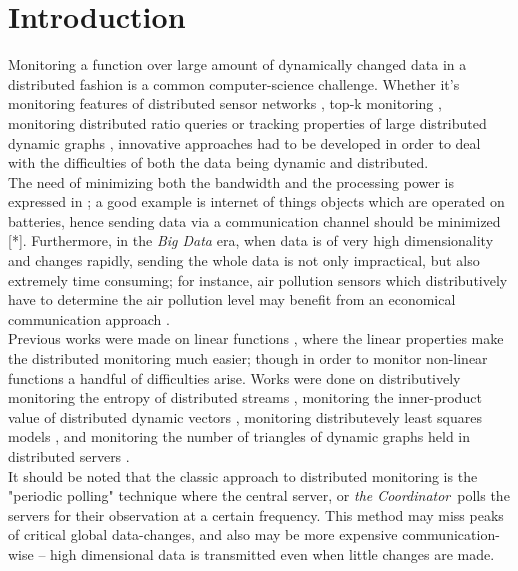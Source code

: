 \documentclass[10pt, conference]{IEEEtran}
\newcommand{\theCoordinator}{\textit{the Coordinator}}
\begin{document}
\section{Introduction}
Monitoring a function over large amount of dynamically changed data in a distributed fashion is a common computer-science challenge. Whether it's monitoring features of distributed sensor networks \cite{burdakis2012detecting}, top-k monitoring \cite{babcock2003distributed}, monitoring distributed ratio queries \cite{gupta2013ratio} or tracking properties of large distributed dynamic graphs \cite{mcgregor2015densest}, innovative approaches had to be developed in order to deal with the difficulties of both the data being dynamic and distributed. \\
The need of minimizing both the bandwidth and the processing power is expressed in \cite{giatrakos2013network}; a good example is internet of things objects which are operated on batteries, hence sending data via a communication channel should be minimized [*]. Furthermore, in the \textit{Big Data} era, when data is of very high dimensionality and changes rapidly, sending the whole data is not only impractical, but also extremely time consuming; for instance, air pollution sensors which distributively have to determine the air pollution level may benefit from an economical communication approach \cite{cheng2004revised}. \\
Previous works were made on linear functions \cite{keralapura2006communication}, where the linear properties make the distributed monitoring much easier; though in order to monitor non-linear functions a handful of difficulties arise. Works were done on distributively monitoring the entropy of distributed streams \cite{gabel2017anarchists}\cite{cormode2013continuous}, monitoring the inner-product value of distributed dynamic vectors \cite{garofalakis2013sketch}, monitoring distributevely least squares models \cite{gabel2015monitoring}, and monitoring the number of triangles of dynamic graphs held in distributed servers \cite{yehuda2017monitoring}. \\
It should be noted that the classic approach to distributed monitoring is the "periodic polling" technique \cite{cormode2013continuous} where the central server, or \theCoordinator \ polls the servers for their observation at a certain frequency. This method may miss peaks of critical global data-changes, and also may be more expensive communication-wise -- high dimensional data is transmitted even when little changes are made. \\
\end{document}
